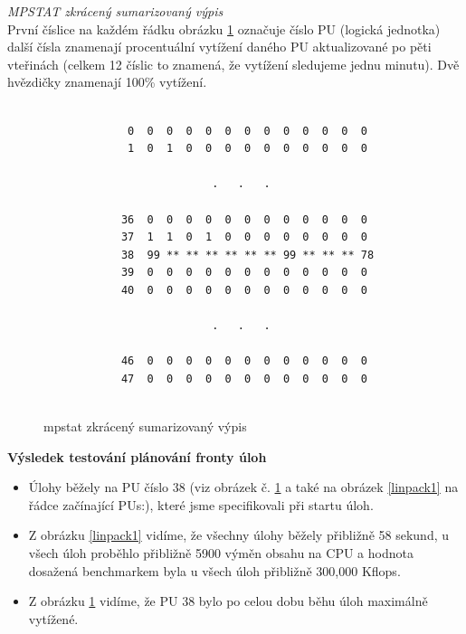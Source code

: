 \documentclass[
  master=true,
  font=sans,
  printversion=false,
  joinlists=true,
  figures=true,
  tables=true,
  sourcecodes=false,
  theorems=false,
  bibencoding=utf8,
  language=czech,
  encoding=utf8,
  field=ainfk,
  biblatex,
  glossaries,
  index
]{kidiplom}
\begin{document}

\newpage
\noindent
\textit{MPSTAT zkrácený sumarizovaný výpis} \\ 

První číslice na každém řádku obrázku \ref{mpstat1} označuje číslo PU (logická jednotka) další čísla znamenají procentuální vytížení daného PU aktualizované po pěti vteřinách (celkem 12 číslic to znamená, že vytížení sledujeme jednu minutu). Dvě hvězdičky znamenají 100\% vytížení. 

\begin{figure}[ht]
\caption{mpstat zkrácený sumarizovaný výpis}
\center
\label{mpstat1}

\begin{Verbatim}[frame=single]

             0  0  0  0  0  0  0  0  0  0  0  0  0
             1  0  1  0  0  0  0  0  0  0  0  0  0
            
                          .   .   .
           
            36  0  0  0  0  0  0  0  0  0  0  0  0
            37  1  1  0  1  0  0  0  0  0  0  0  0
            38  99 ** ** ** ** ** ** 99 ** ** ** 78
            39  0  0  0  0  0  0  0  0  0  0  0  0
            40  0  0  0  0  0  0  0  0  0  0  0  0
           
                          .   .   .
           
            46  0  0  0  0  0  0  0  0  0  0  0  0
            47  0  0  0  0  0  0  0  0  0  0  0  0
           
\end{Verbatim}
\end{figure}

\noindent
\textbf{Výsledek testování plánování fronty úloh}

\begin{itemize}
\item Úlohy běžely na PU číslo 38 (viz obrázek č. \ref{mpstat1} a také na obrázek \ref{linpack1} na řádce začínající PUs:), které jsme specifikovali při startu úloh.
\item Z obrázku \ref{linpack1} vidíme, že všechny úlohy běžely přibližně 58 sekund, u všech úloh proběhlo přibližně 5900 výměn obsahu na CPU a hodnota dosažená benchmarkem byla u všech úloh přibližně 300,000 Kflops.
\item Z obrázku \ref{mpstat1} vidíme, že PU 38 bylo po celou dobu běhu úloh maximálně vytížené.
\end{itemize}
\end{document}

